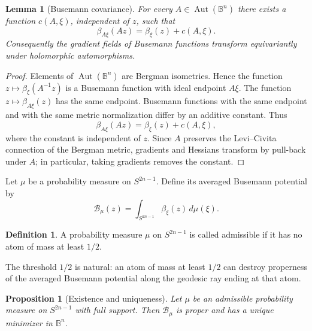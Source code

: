 \documentclass[11pt]{article}
\newtheorem{proposition}[theorem]{Proposition}
\newtheorem{lemma}[theorem]{Lemma}
\theoremstyle{definition}
\newtheorem{definition}[theorem]{Definition}
\theoremstyle{remark}
\theoremstyle{definition}
\newcommand{\B}{\mathbb B}
\newcommand{\Aut}{\operatorname{Aut}}
\begin{document}
\begin{lemma}[Busemann covariance]\label{busemann-cocycle}
For every \(A\in\Aut(\B^n)\) there exists a function \(c(A,\xi)\), independent
of \(z\), such that
\begin{equation}\label{cocycle-formula}
        \beta_{A\xi}(Az)=\beta_\xi(z)+c(A,\xi).
\end{equation}
Consequently the gradient fields of Busemann functions transform equivariantly
under holomorphic automorphisms.
\end{lemma}

\begin{proof}
Elements of \(\Aut(\B^n)\) are Bergman isometries.  Hence the function
\(z\mapsto \beta_\xi(A^{-1}z)\) is a Busemann function with ideal endpoint
\(A\xi\).  The function \(z\mapsto\beta_{A\xi}(z)\) has the same endpoint.
Busemann functions with the same endpoint and with the same metric
normalization differ by an additive constant.  Thus
\[
        \beta_{A\xi}(Az)=\beta_\xi(z)+c(A,\xi),
\]
where the constant is independent of \(z\).  Since \(A\) preserves the
Levi--Civita connection of the Bergman metric, gradients and Hessians transform
by pull-back under \(A\); in particular, taking gradients removes the constant.
\end{proof}

Let \(\mu\) be a probability measure on \(S^{2n-1}\).  Define its averaged
Busemann potential by
\begin{equation}\label{barycenter-potential}
        \mathcal B_\mu(z)=\int_{S^{2n-1}}\beta_\xi(z)\,d\mu(\xi).
\end{equation}

\begin{definition}
A probability measure \(\mu\) on \(S^{2n-1}\) is called admissible if it has no
atom of mass at least \(1/2\).
\end{definition}

The threshold \(1/2\) is natural: an atom of mass at least \(1/2\) can destroy
properness of the averaged Busemann potential along the geodesic ray ending at
that atom.

\begin{proposition}[Existence and uniqueness]\label{existence-uniqueness-barycenter}
Let \(\mu\) be an admissible probability measure on \(S^{2n-1}\) with full
support.  Then \(\mathcal B_\mu\) is proper and has a unique minimizer in
\(\B^n\).
\end{proposition}
\end{document}
